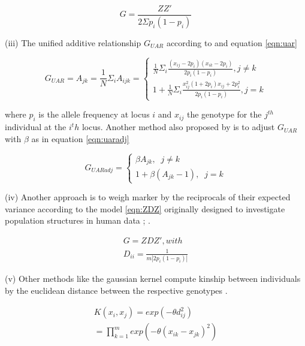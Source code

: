 \begin{equation}
  G = \frac{ZZ'}{2 \Sigma p_i (1-p_i)} 
\label{eqn:vanraden}
\end{equation}

(iii) The unified additive relationship $G_{UAR}$ according to \cite{yang2010common} and equation \ref{eqn:uar}

\begin{equation}
  G_{UAR} =  A_{jk} = \frac{1}{N} \Sigma_i{A_{ijk}} = \left\{
    \!\begin{aligned}
      \frac{1}{N} \Sigma_{i} \frac{(x_{ij} - 2p_i)(x_{ik} - 2p_i)}{2p_i  (1-p_i)}, j \ne k \\
      1 + \frac{1}{N} \Sigma_i \frac{x_{ij}^2 (1+2p_i) x_{ij} + 2p_i^2 }{2p_i (1-p_i)}, j = k     
    \end{aligned}
  \right.
  \label{eqn:uar}
\end{equation}

where $p_i$ is the allele frequency at locus $i$ and $x_{ij}$ the genotype for the $j^{th}$ individual at the
$i^th$ locus. Another method also proposed by \cite{yang2010common} is to adjust $G_{UAR}$ with $\beta$ as in
equation \ref{eqn:uaradj}

\begin{equation}
  G_{UARadj} = \left\{
    \!\begin{aligned}
      \beta A_{jk}, \;\; j \ne k \\
      1 + \beta (A_{jk}-1 ), \;\; j = k      
    \end{aligned}
    \right.
  \label{eqn:uaradj}
\end{equation}

(iv) Another approach is to weigh marker by the reciprocals of their expected variance according to the model
\ref{eqn:ZDZ} originally designed to investigate population structures in human data
\cite{leutenegger2003estimation}; \cite{amin2007genomic}.

\begin{equation}
  \!\begin{aligned}
    G = ZDZ' , with \\
    D_{ii} = \frac{1}{m | 2p_i(1-p_i) | }
  \end{aligned}
  \label{eqn:ZDZ}
\end{equation}


(v) Other methods like the gaussian kernel compute kinship between individuals by the euclidean distance
between the respective genotypes \cite{morota2014kernel}.

\begin{equation}
  \!\begin{aligned}
    K(x_i,x_j) = exp (- \theta d_{ij}^2) \\
    = \prod_{k=1}^m exp (- \theta(x_{ik} - x_{jk})^2)
  \end{aligned}
  \label{eqn:gauss}
\end{equation}

